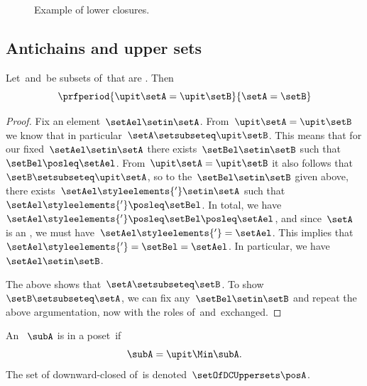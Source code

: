 \begin{figure}[h!]
    \centering
    \hfill
    \hfill
    \caption{Example of lower closures.}
    \label{fig:examplebatt}
\end{figure}

\subsection{Antichains and upper sets}

\begin{lemma}
    \label{lem:up-cl-inj-antichains}
    Let~\setA and~\setB be subsets of~\posA that are .
    Then
    \begin{equation}
        \prfperiod{
            \upit \setA = \upit \setB
        }{
            \setA = \setB
        }
    \end{equation}
\end{lemma}

\begin{proof}
    Fix an element~$\setAel \setin \setA$.
    From~$\upit \setA = \upit \setB$ we know that in particular~$\setA \setsubseteq \upit \setB$.
    This means that for our fixed~$\setAel \setin \setA$ there exists~$\setBel \setin \setB$ such that~$\setBel \posleq \setAel$.
    From~$\upit \setA = \upit \setB$ it also follows that~$\setB \setsubseteq \upit \setA$, so to the~$\setBel \setin \setB$ given above, there exists~$\setAel\styleelements{'} \setin \setA$ such that~$\setAel\styleelements{'} \posleq \setBel$.
    In total, we have~$\setAel\styleelements{'} \posleq \setBel \posleq \setAel$, and since~$\setA$ is an , we must have~$\setAel\styleelements{'} = \setAel$.
    This implies that~$\setAel\styleelements{'} = \setBel = \setAel$.
    In particular, we have~$\setAel \setin \setB$.

    The above shows that~$\setA \setsubseteq \setB$.
    To show~$\setB \setsubseteq \setA$, we can fix any~$\setBel \setin \setB$ and repeat the above argumentation, now with the roles of~\setA and~\setB exchanged.
\end{proof}

\begin{definition}
    \label{def:downward-closed-upperset}
    An ~$\subA$ is  in a poset~\posA if
    \begin{equation}
        \subA = \upit \Min \subA.
    \end{equation}
    The set of downward-closed  of~\posA is denoted~$\setOfDCUppersets \posA$.

\end{definition}

